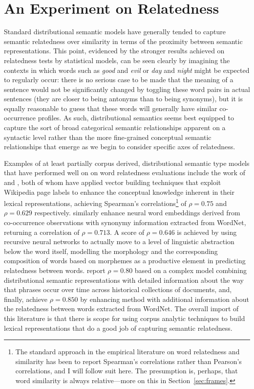 \section{An Experiment on Relatedness}
Standard distributional semantic models have generally tended to capture semantic relatedness over similarity in terms of the proximity between semantic representations.  This point, evidenced by the stronger results achieved on relatedness tests by statistical models, can be seen clearly by imagining the contexts in which words such as \emph{good} and \emph{evil} or \emph{day} and \emph{night} might be expected to regularly occur: there is no serious case to be made that the meaning of a sentence would not be significantly changed by toggling these word pairs in actual sentences (they are closer to being antonyms than to being synonyms), but it is equally reasonable to guess that these words will generally have similar co-occurrence profiles.  As such, distributional semantics seems best equipped to capture the sort of broad categorical semantic relationships apparent on a syntactic level rather than the more fine-grained conceptual semantic relationships that emerge as we begin to consider specific axes of relatedness.

Examples of at least partially corpus derived, distributional semantic type models that have performed well on on word relatedness evaluations include the work of \cite{GabrilovichEA2007} and \cite{HassanEA2011}, both of whom have applied vector building techniques that exploit Wikipedia page labels to enhance the conceptual knowledge inherent in their lexical representations, achieving Spearman's correlations\footnote{The standard approach in the empirical literature on word relatedness and similarity has been to report Spearman's correlations rather than Pearson's correlations, and I will follow suit here.  The presumption is, perhaps, that word similarity is always relative---more on this in Section~\ref{sec:frames}.} of $\rho = 0.75$ and $\rho = 0.629$ respectively.  \cite{HuangEA2012} similarly enhance neural word embeddings derived from co-occurrence observations with synonymy information extracted from WordNet, returning a correlation of $\rho = 0.713$.  A score of $\rho = 0.646$ is achieved by \cite{LuongEA2013} using recursive neural networks to actually move to a level of linguistic abstraction below the word itself, modelling the morphology and the corresponding composition of words based on morphemes as a productive element in predicting relatedness between words.  \cite{RadinskyEA2011} report $\rho = 0.80$ based on a complex model combining distributional semantic representations with detailed information about the way that phrases occur over time across historical collections of documents, and, finally, \cite{HalawiEA2012} achieve $\rho = 0.850$ by enhancing  method with additional information about the relatedness between words extracted from WordNet.  The overall import of this literature is that there is scope for using corpus analytic techniques to build lexical representations that do a good job of capturing semantic relatedness.

